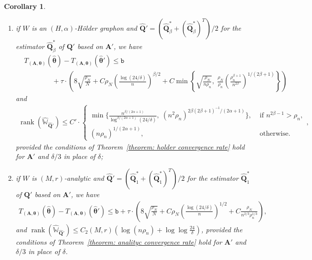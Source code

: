 \documentclass[11pt]{article}
\newcommand{\bA}{\bm{A}}
\newcommand{\bQ}{\bm{Q}}
\newcommand{\btheta}{\bm{\theta}}
\newcommand{\bbW}{\mathbb{W}}
\newcommand{\<}{\langle}
\renewcommand{\>}{\rangle}
\newcommand{\ttb}{\mathtt{b}}
\DeclareMathOperator{\rank}{rank}
\theoremstyle{plain}
\newtheorem{corollary}{Corollary}
\theoremstyle{definition}
\theoremstyle{remark}
\begin{document}
\begin{corollary}
\begin{enumerate}
        \item if $W$ is an $(H, \alpha)$-H\"older graphon and $\widehat{\bQ}' = (\widehat{\bQ}^*_\beta + (\widehat{\bQ}^*_{\beta})^T)/2$ for the estimator $\widehat{\bQ}^*_\beta$ of ${\bQ}'$ based on $\bA'$, we have
        \begin{align*}
            & T_{(\bA, \btheta)}(\hat{\btheta}) - T_{(\bA, \btheta)}(\hat{\btheta}') \le \ttb  \\
    & \qquad \qquad + \tau \cdot \left ( 8 \sqrt{\frac{\rho_N}{N}} + C \rho_N \left ( \frac{\log (24 /\delta)}{n} \right )^{\beta/2} + C \min \left \{\sqrt{\frac{\rho_N}{n \rho_n}}, \; \frac{\rho_N}{\rho_n}\left ( \frac{\rho_n^{\beta + 1}}{n^{2 \beta}} \right )^{1/(2 \beta + 1)} \right \} \right )
        \end{align*}
        and
        \begin{align*}
            \rank(\widehat{\bbW}_{\widehat{\bQ}'}) \le C' \cdot \begin{cases}
            \min \Big \{\frac{n^{\beta/(2 \alpha + 1)}}{\log^{\beta/(2 \alpha + 1)}(24/\delta)}, \; (n^2 \rho_n)^{2\beta (2 \beta + 1)^{-1} / (2\alpha + 1)} \Big \}, & \text{ if } n^{2 \beta - 1} > \rho_n, \\
            (n \rho_n)^{1/(2 \alpha + 1)}, & \text{ otherwise.}
        \end{cases},
        \end{align*}
    provided the conditions of Theorem~\ref{theorem: holder convergence rate} hold for $\bA'$ and $\delta/3$ in place of $\delta$;
    \item if $W$ is $(M, r)$-analytic and $\widehat{\bQ}' = (\widehat{\bQ}^*_1 + (\widehat{\bQ}^*_1)^T)/2$ for the estimator $\widehat{\bQ}_1^*$ of $\bQ'$ based on $\bA'$, we have
    \begin{align*}
        T_{(\bA, \btheta)}(\hat{\btheta}) - T_{(\bA, \btheta)}(\hat{\btheta}') \le \ttb  + \tau \cdot \left ( 8 \sqrt{\frac{\rho_N}{N}} + C \rho_N \left ( \frac{\log (24 /\delta)}{n} \right )^{1/2} + C \frac{\rho_N}{n^{2/3} \rho_n^{1/3}} \right ),
    \end{align*}
    and $\rank(\widehat{\bbW}_{\widehat{\bQ}'}) \le C_2(M, r) (\log (n \rho_n) + \log \log \frac{24}{\delta})$, provided the conditions of Theorem~\ref{theorem: analityc convergence rate} hold for $\bA'$ and $\delta/3$ in place of $\delta$.
    \end{enumerate}


    
 \end{corollary}
\end{document}
